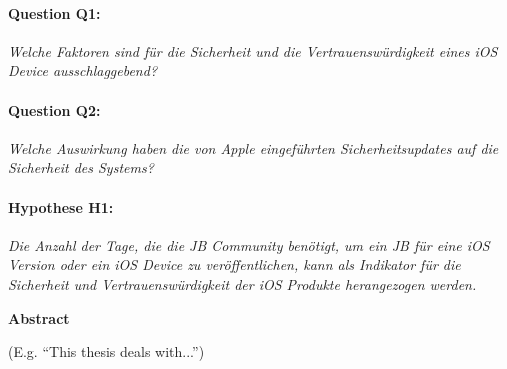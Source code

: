 \paragraph{Question Q1:} \textit{\glqq Welche Faktoren sind für die Sicherheit und die Vertrauenswürdigkeit eines iOS Device ausschlaggebend?\grqq{}}
\paragraph{Question Q2:} \textit{\glqq Welche Auswirkung haben die von Apple eingeführten Sicherheitsupdates auf die Sicherheit des Systems?\grqq{}}        
\paragraph{Hypothese H1:}\textit{\glqq Die Anzahl der Tage, die die JB Community benötigt, um ein JB für eine iOS Version oder ein iOS Device zu veröffentlichen, kann als Indikator für die Sicherheit und Vertrauenswürdigkeit der iOS Produkte herangezogen werden.\grqq{}}




\cleardoublepage


\begin{center}
{\Large\bfseries Abstract}
\end{center}

(E.g. ``This thesis deals with...'')

